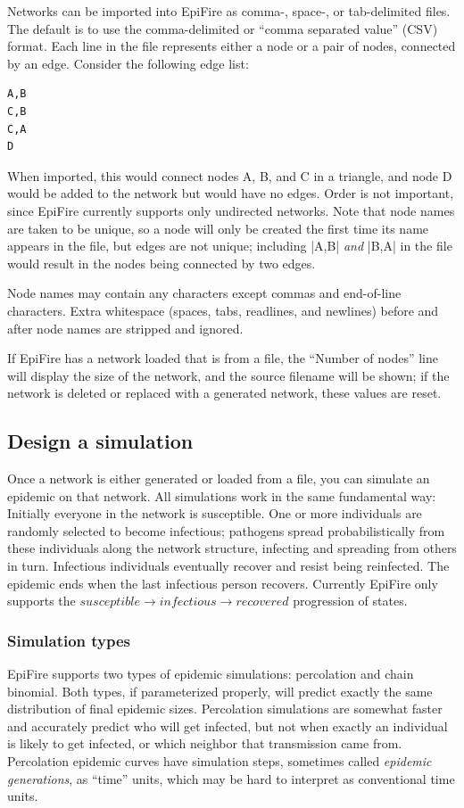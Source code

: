 \documentclass{article}
\begin{document}
Networks can be imported into EpiFire as comma-, space-, or tab-delimited files.  The default is to use the comma-delimited or ``comma separated value'' (CSV) format.  Each line in the file represents either a node or a pair of nodes, connected by an edge.  Consider the following edge list:

\begin{Verbatim}
A,B
C,B
C,A
D
\end{Verbatim}

When imported, this would connect nodes A, B, and C in a triangle, and node D would be added to the network but would have no edges.  Order is not important, since EpiFire currently supports only undirected networks.  Note that node names are taken to be unique, so a node will only be created the first time its name appears in the file, but edges are not unique; including |A,B| \textit{and} |B,A| in the file would result in the nodes being connected by two edges.

Node names may contain any characters except commas and end-of-line characters.  Extra whitespace (spaces, tabs, readlines, and newlines) before and after node names are stripped and ignored.

If EpiFire has a network loaded that is from a file, the ``Number of nodes'' line will display the size of the network, and the source filename will be shown; if the network is deleted or replaced with a generated network, these values are reset.

\subsection{Design a simulation}

Once a network is either generated or loaded from a file, you can simulate an epidemic on that network.  All simulations work in the same fundamental way: Initially everyone in the network is susceptible.  One or more individuals are randomly selected to become infectious; pathogens spread probabilistically from these individuals along the network structure, infecting and spreading from others in turn.  Infectious individuals eventually recover and resist being reinfected. The epidemic ends when the last infectious person recovers.  Currently EpiFire only supports the $susceptible \rightarrow infectious \rightarrow recovered$ progression of states.

\subsubsection{Simulation types}
EpiFire supports two types of epidemic simulations: percolation and chain binomial.  Both types, if parameterized properly, will predict exactly the same distribution of final epidemic sizes.  Percolation simulations are somewhat faster and accurately predict who will get infected, but not when exactly an individual is likely to get infected, or which neighbor that transmission came from.  Percolation epidemic curves have simulation steps, sometimes called \textit{epidemic generations}, as ``time'' units, which may be hard to interpret as conventional time units.
\end{document}
